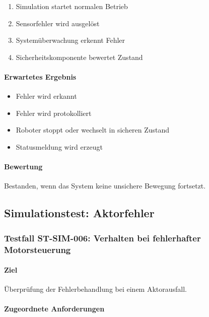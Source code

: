\documentclass[
  a4paper,
  12pt,
  DIV=12,        %
  parskip=half,  %
  headings=small %
]{scrartcl}
\theoremstyle{definition}
\providecommand{\tightlist}{%
  \setlength{\itemsep}{0pt}\setlength{\parskip}{0pt}}
\theoremstyle{definition}
\begin{document}
\begin{enumerate}
\def\labelenumi{\arabic{enumi}.}
\tightlist
\item
  Simulation startet normalen Betrieb
\item
  Sensorfehler wird ausgelöst
\item
  Systemüberwachung erkennt Fehler
\item
  Sicherheitskomponente bewertet Zustand
\end{enumerate}

\paragraph{Erwartetes Ergebnis}\label{erwartetes-ergebnis-20}

\begin{itemize}
\tightlist
\item
  Fehler wird erkannt
\item
  Fehler wird protokolliert
\item
  Roboter stoppt oder wechselt in sicheren Zustand
\item
  Statusmeldung wird erzeugt
\end{itemize}

\paragraph{Bewertung}\label{bewertung-20}

Bestanden, wenn das System keine unsichere Bewegung fortsetzt.

\subsection{Simulationstest:
Aktorfehler}\label{simulationstest-aktorfehler}

\subsubsection{Testfall ST-SIM-006: Verhalten bei fehlerhafter
Motorsteuerung}\label{testfall-st-sim-006-verhalten-bei-fehlerhafter-motorsteuerung}

\paragraph{Ziel}\label{ziel-21}

Überprüfung der Fehlerbehandlung bei einem Aktorausfall.

\paragraph{Zugeordnete
Anforderungen}\label{zugeordnete-anforderungen-21}
\end{document}
